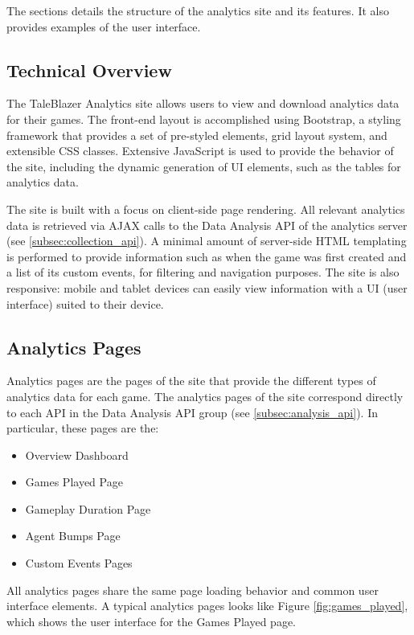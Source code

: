The sections details the structure of the analytics site and its features. It also provides examples of the user interface. 

\subsection{Technical Overview}

The TaleBlazer Analytics site allows users to view and download analytics data for their games. The front-end layout is accomplished using Bootstrap, a styling framework that provides a set of pre-styled elements, grid layout system, and extensible CSS classes. Extensive JavaScript is used to provide the behavior of the site, including the dynamic generation of UI elements, such as the tables for analytics data. 

The site is built with a focus on client-side page rendering. All relevant analytics data is retrieved via AJAX calls to the Data Analysis API of the analytics server (see \ref{subsec:collection_api}). A minimal amount of server-side HTML templating is performed to provide information such as when the game was first created and a list of its custom events, for filtering and navigation purposes. The site is also responsive: mobile and tablet devices can easily view information with a UI (user interface) suited to their device.

\subsection{Analytics Pages}

Analytics pages are the pages of the site that provide the different types of analytics data for each game. The analytics pages of the site correspond directly to each API in the Data Analysis API group (see \ref{subsec:analysis_api}). In particular, these pages are the:
	\begin{itemize}
		\item Overview Dashboard
		\item Games Played Page
		\item Gameplay Duration Page
		\item Agent Bumps Page
		\item Custom Events Pages
	\end{itemize}
All analytics pages share the same page loading behavior and common user interface elements. A typical analytics pages looks like Figure \ref{fig:games_played}, which shows the user interface for the Games Played page.

